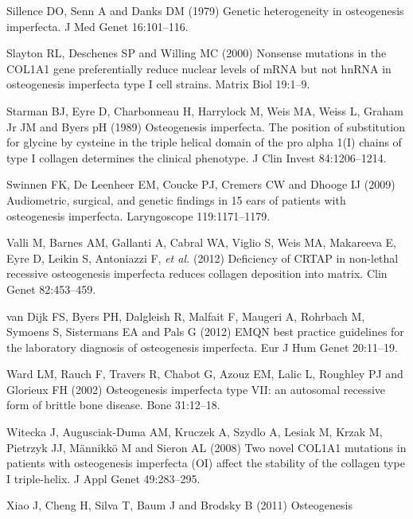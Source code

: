 \par Sillence DO, Senn A and Danks DM (1979) Genetic heterogeneity in
                    osteogenesis imperfecta. J Med Genet 16:101–116.
\par Slayton RL, Deschenes SP and Willing MC (2000) Nonsense mutations in
                    the COL1A1 gene preferentially reduce nuclear levels of mRNA but not hnRNA in
                    osteogenesis imperfecta type I cell strains. Matrix Biol
                    19:1–9.
\par Starman BJ, Eyre D, Charbonneau H, Harrylock M, Weis MA, Weiss L,
                    Graham Jr JM and Byers pH (1989) Osteogenesis imperfecta. The position of
                    substitution for glycine by cysteine in the triple helical domain of the pro
                    alpha 1(I) chains of type I collagen determines the clinical phenotype. J Clin
                    Invest 84:1206–1214.
\par Swinnen FK, De Leenheer EM, Coucke PJ, Cremers CW and Dhooge IJ
                    (2009) Audiometric, surgical, and genetic findings in 15 ears of patients with
                    osteogenesis imperfecta. Laryngoscope 119:1171–1179.
\par Valli M, Barnes AM, Gallanti A, Cabral WA, Viglio S, Weis MA,
                    Makareeva E, Eyre D, Leikin S, Antoniazzi F, \textit{et al.} (2012)
                    Deficiency of CRTAP in non-lethal recessive osteogenesis imperfecta reduces
                    collagen deposition into matrix. Clin Genet 82:453–459.
\par van Dijk FS, Byers PH, Dalgleish R, Malfait F, Maugeri A, Rohrbach
                    M, Symoens S, Sistermans EA and Pals G (2012) EMQN best practice guidelines for
                    the laboratory diagnosis of osteogenesis imperfecta. Eur J Hum Genet
                    20:11–19.
\par Ward LM, Rauch F, Travers R, Chabot G, Azouz EM, Lalic L, Roughley
                    PJ and Glorieux FH (2002) Osteogenesis imperfecta type VII: an autosomal
                    recessive form of brittle bone disease. Bone 31:12–18.
\par Witecka J, Augusciak-Duma AM, Kruczek A, Szydlo A, Lesiak M, Krzak
                    M, Pietrzyk JJ, Männikkö M and Sieron AL (2008) Two novel COL1A1 mutations in
                    patients with osteogenesis imperfecta (OI) affect the stability of the collagen
                    type I triple-helix. J Appl Genet 49:283–295.
\par Xiao J, Cheng H, Silva T, Baum J and Brodsky B (2011) Osteogenesis
